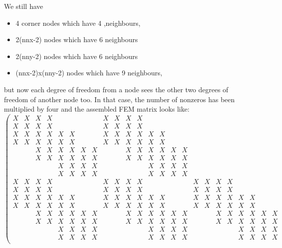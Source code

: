 We still have
\begin{itemize}
\item 4 corner nodes which have 4 ,neighbours,
\item 2(nnx-2) nodes which have 6 neighbours
\item 2(nny-2) nodes which have 6 neighbours
\item (nnx-2)x(nny-2) nodes which have 9 neighbours,
\end{itemize}
but now each degree of freedom from a node sees the other two
degrees of freedom of another node too.
In that case, the number of nonzeros has been multiplied by four
and the assembled FEM matrix looks like:
\begin{equation}
\left(
\begin{array}{cccccccccccccccccccccccc}
X&X & X&X &  &  &  &  & X&X & X&X &  &  &  &  &  &  &  &  &  &  &  &  \\
X&X & X&X &  &  &  &  & X&X & X&X &  &  &  &  &  &  &  &  &  &  &  &  \\
X&X & X&X & X&X &  &  & X&X & X&X & X&X &  &  &  &  &  &  &  &  &  &  \\
X&X & X&X & X&X &  &  & X&X & X&X & X&X &  &  &  &  &  &  &  &  &  &  \\
 &  & X&X & X&X & X&X &  &  & X&X & X&X & X&X &  &  &  &  &  &  &  &  \\
 &  & X&X & X&X & X&X &  &  & X&X & X&X & X&X &  &  &  &  &  &  &  &  \\
 &  &  &  & X&X & X&X &  &  &  &  & X&X & X&X &  &  &  &  &  &  &  &  \\
 &  &  &  & X&X & X&X &  &  &  &  & X&X & X&X &  &  &  &  &  &  &  &  \\
X&X & X&X &  &  &  &  & X&X & X&X &  &  &  &  & X&X & X&X &  &  &  &  \\
X&X & X&X &  &  &  &  & X&X & X&X &  &  &  &  & X&X & X&X &  &  &  &  \\
X&X & X&X & X&X &  &  & X&X & X&X & X&X &  &  & X&X & X&X & X&X &  &  \\
X&X & X&X & X&X &  &  & X&X & X&X & X&X &  &  & X&X & X&X & X&X &  &  \\
 &  & X&X & X&X & X&X &  &  & X&X & X&X & X&X &  &  & X&X & X&X & X&X \\
 &  & X&X & X&X & X&X &  &  & X&X & X&X & X&X &  &  & X&X & X&X & X&X \\
 &  &  &  & X&X & X&X &  &  &  &  & X&X & X&X &  &  &  &  & X&X & X&X \\
 &  &  &  & X&X & X&X &  &  &  &  & X&X & X&X &  &  &  &  & X&X & X&X \\

\end{array}
\end{equation}
